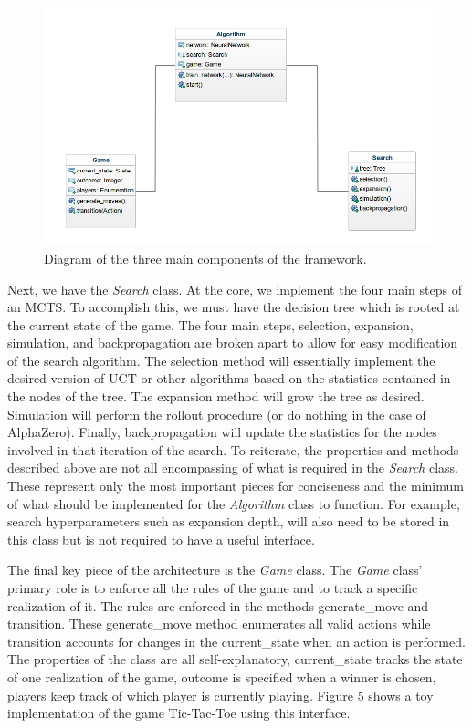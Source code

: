 \documentclass{article}
\begin{document}
  \begin{figure}[H]
    \centering
      \includegraphics[width=\textwidth]{hierarchy}
    \caption[Hierarchy of framework]{Diagram of the three main components of the framework.}
  \end{figure}

  Next, we have the \textit{Search} class. At the core, we implement the four main steps of an MCTS. To accomplish this, we must have the decision tree which is rooted at the current state of the game. The four main steps, selection, expansion, simulation, and backpropagation are broken apart to allow for easy modification of the search algorithm. The selection method will essentially implement the desired version of UCT or other algorithms based on the statistics contained in the nodes of the tree. The expansion method will grow the tree as desired. Simulation will perform the rollout procedure (or do nothing in the case of AlphaZero). Finally, backpropagation will update the statistics for the nodes involved in that iteration of the search. To reiterate, the properties and methods described above are not all encompassing of what is required in the \textit{Search} class. These represent only the most important pieces for conciseness and the minimum of what should be implemented for the \textit{Algorithm} class to function. For example, search hyperparameters such as expansion depth, will also need to be stored in this class but is not required to have a useful interface.

  The final key piece of the architecture is the \textit{Game} class. The \textit{Game} class' primary role is to enforce all the rules of the game and to track a specific realization of it. The rules are enforced in the methods generate\_move and transition. These generate\_move method enumerates all valid actions while transition accounts for changes in the current\_state when an action is performed. The properties of the class are all self-explanatory, current\_state tracks the state of one realization of the game, outcome is specified when a winner is chosen, players keep track of which player is currently playing. Figure 5 shows a toy implementation of the game Tic-Tac-Toe using this interface.
\end{document}
